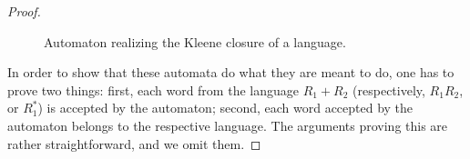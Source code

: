 \begin{proof}
\begin{figure}[ht]
\begin{center}

\end{center}
\caption{Automaton realizing the Kleene closure of a language.}
\label{fig:AutomClosure}
\end{figure}

In order to show that these automata do what they are meant to do, one has to prove two things:
first, each word from the language $R_1 + R_2$ (respectively, $R_1R_2$, or $R_1^*$) is accepted by the automaton;
second, each word accepted by the automaton belongs to the respective language.
The arguments proving this are rather straightforward, and we omit them.
\end{proof}



